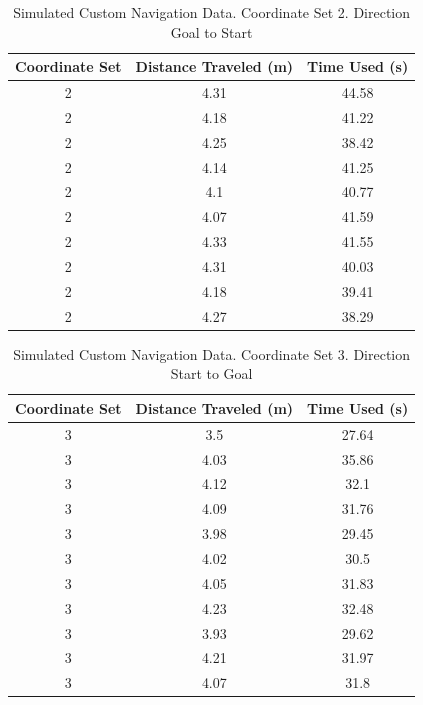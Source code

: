 \documentclass[%
paper=A4,               %
twoside=true,           %
openright,              %
11pt,                   %
bibliography=totoc,     %
titlepage=on,           %
DIV=12,                 %
BCOR=1.5cm,             %
parskip=half,            %
final
]{scrreprt}
\begin{document}
	
	\begin{table}[h!]
		\centering
		\begin{tabular}{|c|c|c|}
			\hline
			Coordinate Set & Distance Traveled (m) & Time Used (s) \\
			\hline
			2 & 4.31 & 44.58 \\
			2 & 4.18 & 41.22 \\
			2 & 4.25 & 38.42 \\
			2 & 4.14 & 41.25 \\
			2 & 4.1 & 40.77 \\
			2 & 4.07 & 41.59 \\
			2 & 4.33 & 41.55 \\
			2 & 4.31 & 40.03 \\
			2 & 4.18 & 39.41 \\
			2 & 4.27 & 38.29 \\
			\hline
		\end{tabular}
		\caption{Simulated Custom Navigation Data. Coordinate Set 2. Direction Goal to Start}
		\label{tab:goal_to_start_set2}
	\end{table}
	
	
\begin{table}[h!]
	\centering
	\begin{tabular}{|c|c|c|}
		\hline
		Coordinate Set & Distance Traveled (m)& Time Used (s) \\
		\hline
		3 & 3.5 & 27.64 \\
		3 & 4.03 & 35.86 \\
		3 & 4.12 & 32.1 \\
		3 & 4.09 & 31.76 \\
		3 & 3.98 & 29.45 \\
		3 & 4.02 & 30.5 \\
		3 & 4.05 & 31.83 \\
		3 & 4.23 & 32.48 \\
		3 & 3.93 & 29.62 \\
		3 & 4.21 & 31.97 \\
		3 & 4.07 & 31.8 \\
	\end{tabular}
	\caption{Simulated Custom Navigation Data. Coordinate Set 3. Direction Start to Goal}
	\label{tab:start_to_goal_set3}
\end{table}
\end{document}
